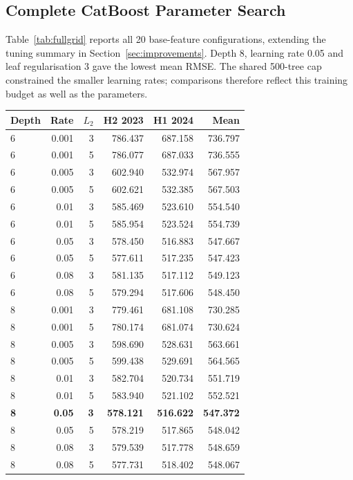 \documentclass[conference]{IEEEtran}
\makeatletter
\newenvironment{localtable}{\par\addvspace{\medskipamount}\noindent
  \begin{minipage}{\columnwidth}\def\@captype{table}}{\end{minipage}\par
  \addvspace{\medskipamount}}
\makeatother
\begin{document}
\subsection{Complete CatBoost Parameter Search}
Table~\ref{tab:fullgrid} reports all 20 base-feature configurations, extending
the tuning summary in Section~\ref{sec:improvements}. Depth 8, learning rate
0.05 and leaf regularisation 3 gave the lowest mean RMSE. The shared
500-tree cap constrained the smaller learning rates; comparisons therefore
reflect this training budget as well as the parameters.
\begin{localtable}
  \caption{Full CatBoost grid on 35 base inputs. H2 2023 and H1 2024 denote the two selection windows; bold marks the selected configuration.}
  \label{tab:fullgrid}
  \centering\small
  \setlength{\tabcolsep}{3pt}
  \begin{tabularx}{\columnwidth}{Xrrrrr}
    \toprule
Depth & Rate & $L_2$ & H2 2023 & H1 2024 & Mean \\
    \midrule
6 & 0.001 & 3 & 786.437 & 687.158 & 736.797 \\
6 & 0.001 & 5 & 786.077 & 687.033 & 736.555 \\
6 & 0.005 & 3 & 602.940 & 532.974 & 567.957 \\
6 & 0.005 & 5 & 602.621 & 532.385 & 567.503 \\
6 & 0.01 & 3 & 585.469 & 523.610 & 554.540 \\
6 & 0.01 & 5 & 585.954 & 523.524 & 554.739 \\
6 & 0.05 & 3 & 578.450 & 516.883 & 547.667 \\
6 & 0.05 & 5 & 577.611 & 517.235 & 547.423 \\
6 & 0.08 & 3 & 581.135 & 517.112 & 549.123 \\
6 & 0.08 & 5 & 579.294 & 517.606 & 548.450 \\
8 & 0.001 & 3 & 779.461 & 681.108 & 730.285 \\
8 & 0.001 & 5 & 780.174 & 681.074 & 730.624 \\
8 & 0.005 & 3 & 598.690 & 528.631 & 563.661 \\
8 & 0.005 & 5 & 599.438 & 529.691 & 564.565 \\
8 & 0.01 & 3 & 582.704 & 520.734 & 551.719 \\
8 & 0.01 & 5 & 583.940 & 521.102 & 552.521 \\
\textbf{8} & \textbf{0.05} & \textbf{3} & \textbf{578.121} & \textbf{516.622} & \textbf{547.372} \\
8 & 0.05 & 5 & 578.219 & 517.865 & 548.042 \\
8 & 0.08 & 3 & 579.539 & 517.778 & 548.659 \\
8 & 0.08 & 5 & 577.731 & 518.402 & 548.067 \\
    \bottomrule
  \end{tabularx}
\end{localtable}
\end{document}
